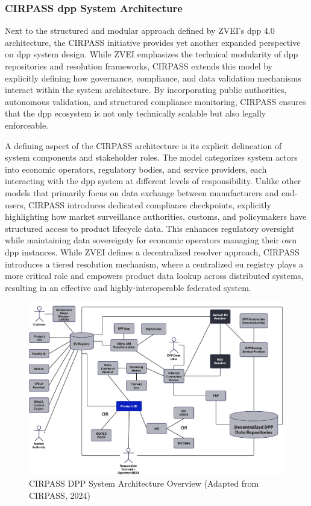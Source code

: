 \subsubsection*{CIRPASS \ac{dpp} System Architecture}
Next to the structured and modular approach defined by ZVEI’s \ac{dpp} 4.0 architecture, the CIRPASS initiative provides yet another expanded perspective on \ac{dpp} system design. While ZVEI emphasizes the technical modularity of \ac{dpp} repositories and resolution frameworks, CIRPASS extends this model by explicitly defining how governance, compliance, and data validation mechanisms interact within the system architecture. By incorporating public authorities, autonomous validation, and structured compliance monitoring, CIRPASS ensures that the \ac{dpp} ecosystem is not only technically scalable but also legally enforceable. \autocite{Wenning.2024}

A defining aspect of the CIRPASS architecture is its explicit delineation of system components and stakeholder roles. The model categorizes system actors into economic operators, regulatory bodies, and service providers, each interacting with the \ac{dpp} system at different levels of responsibility. Unlike other models that primarily focus on data exchange between manufacturers and end-users, CIRPASS introduces dedicated compliance checkpoints, explicitly highlighting how market surveillance authorities, customs, and policymakers have structured access to product lifecycle data. This enhances regulatory oversight while maintaining data sovereignty for economic operators managing their own \ac{dpp} instances. While ZVEI defines a decentralized resolver approach, CIRPASS introduces a tiered resolution mechanism, where a centralized \ac{eu} registry plays a more critical role and empowers product data lookup across distributed systems, resulting in an effective and highly-interoperable federated system. \autocite{Wenning.2024, Garrels.2023}

\begin{figure}[htbp]
    \centering
    \includegraphics[width=\textwidth]{figures/dpp_cirpass_architecture.pdf}
    \caption{CIRPASS DPP System Architecture Overview (Adapted from CIRPASS, 2024)}
    \label{fig:dpp_cirpass_architecture}
\end{figure}


